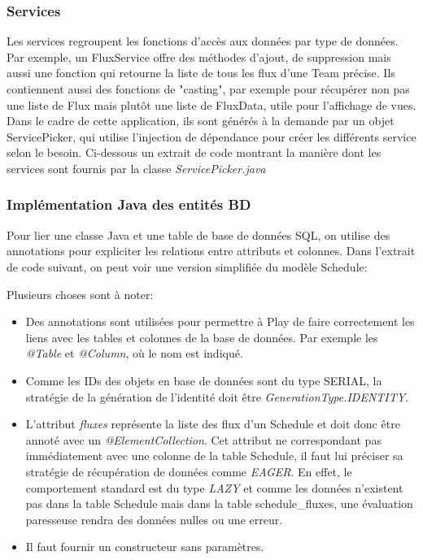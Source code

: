 \documentclass[french]{article}
\begin{document}
\subsubsection{Services}

Les services regroupent les fonctions d'accès aux données par type de données. Par exemple, un FluxService offre des méthodes d'ajout, de suppression mais aussi une fonction qui retourne la liste de tous les flux d'une Team précise. Ils contiennent aussi des fonctions de "casting", par exemple pour récupérer non pas une liste de Flux mais plutôt une liste de FluxData, utile pour l'affichage de vues.\newline
Dans le cadre de cette application, ils sont générés à la demande par un objet ServicePicker, qui utilise l'injection de dépendance pour créer les différents service selon le besoin. Ci-dessous un extrait de code montrant la manière dont les services sont fournis par la classe \textit{ServicePicker.java}



\subsubsection{Implémentation Java des entités BD}

Pour lier une classe Java et une table de base de données SQL, on utilise des annotations pour expliciter les relations entre attributs et colonnes. Dans l'extrait de code suivant, on peut voir une version simplifiée du modèle Schedule:



Plusieurs choses sont à noter:
\begin{itemize}
	\item Des annotations sont utilisées pour permettre à Play de faire correctement les liens avec les tables et colonnes de la base de données. Par exemple les \textit{@Table} et \textit{@Column}, où le nom est indiqué.
	\item Comme les IDs des objets en base de données sont du type SERIAL, la stratégie de la génération de l'identité doit être \textit{GenerationType.IDENTITY}.
	\item L'attribut \textit{fluxes} représente la liste des flux d'un Schedule et doit donc être annoté avec un \textit{@ElementCollection}. Cet attribut ne correspondant pas immédiatement avec une colonne de la table Schedule, il faut lui préciser sa stratégie de récupération de données comme \textit{EAGER}. En effet, le comportement standard est du type \textit{LAZY} et comme les données n'existent pas dans la table Schedule mais dans la table schedule\_fluxes, une évaluation paresseuse rendra des données nulles ou une erreur.
	\item Il faut fournir un constructeur sans paramètres.
\end{itemize}
\end{document}
